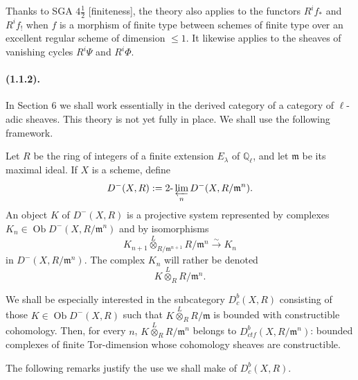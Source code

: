 \documentclass[11pt]{article}
\theoremstyle{remark}
\newcommand{\Ql}{\mathbb{Q}_\ell}
\newcommand{\Ob}{\operatorname{Ob}}
\newcommand{\limproj}{\varprojlim}
\begin{document}
Thanks to SGA $4\frac12$ [finiteness], the theory also applies to the functors $R^if_{*}$ and $R^if_{!}$ when $f$ is a morphism of finite type between schemes of finite type over an excellent regular scheme of dimension $\le1$. It likewise applies to the sheaves of vanishing cycles $R^i\Psi$ and $R^i\Phi$.

\paragraph{(1.1.2).} In Section 6 we shall work essentially in the derived category of a category of $\ell$-adic sheaves. This theory is not yet fully in place. We shall use the following framework.

Let $R$ be the ring of integers of a finite extension $E_\lambda$ of $\Ql$, and let $\mathfrak m$ be its maximal ideal. If $X$ is a scheme, define
\[
D^-(X,R):=2\text{-}\limproj_n D^-(X,R/\mathfrak m^n).
\]
An object $K$ of $D^-(X,R)$ is a projective system represented by complexes $K_n\in\Ob D^-(X,R/\mathfrak m^n)$ and by isomorphisms
\[
K_{n+1}\overset L\otimes_{R/\mathfrak m^{n+1}} R/\mathfrak m^n \xrightarrow{\sim} K_n
\]
in $D^-(X,R/\mathfrak m^n)$. The complex $K_n$ will rather be denoted
\[
K\overset L\otimes_R R/\mathfrak m^n.
\]

We shall be especially interested in the subcategory $D^b_c(X,R)$ consisting of those $K\in\Ob D^-(X,R)$ such that $K\overset L\otimes_R R/\mathfrak m$ is bounded with constructible cohomology. Then, for every $n$, $K\overset L\otimes_R R/\mathfrak m^n$ belongs to $D^b_{ctf}(X,R/\mathfrak m^n)$: bounded complexes of finite Tor-dimension whose cohomology sheaves are constructible.

The following remarks justify the use we shall make of $D^b_c(X,R)$.
\end{document}
